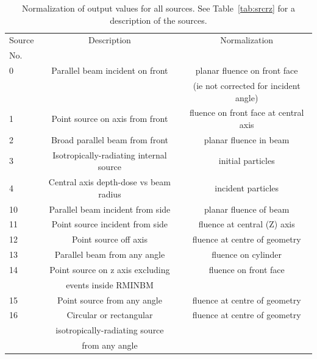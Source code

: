 \documentclass[12pt,twoside]{article}  %
\begin{document}
\begin{htmlonly}
\begin{table}[htb]
\begin{tabular}{|lcc|}
\caption[Normalization for all available sources.]
{Normalization of output values for all sources.  See Table~\ref{tab:srcrz}
for a description of the sources.}\\
\hline\hline
Source & Description & Normalization\\
No.  & & \\
\hline
0 & Parallel beam incident on front & planar fluence on front face \\
  &                                   & (ie not corrected for incident angle)\\
\hline
1 & Point source on axis from front & fluence on front face at central axis\\
\hline
2 & Broad parallel beam from front & planar fluence in beam\\
\hline
3 & Isotropically-radiating internal source & initial particles\\
\hline
4 & Central axis depth-dose vs beam radius & incident particles\\
\hline
10 & Parallel beam incident from side & planar fluence of beam\\
\hline
11 & Point source incident from side & fluence at  central (Z) axis\\
\hline
12 & Point source off axis & fluence at centre of geometry\\ 
\hline
13 & Parallel beam from any angle & fluence on cylinder\\
\hline
14 & Point source on z axis excluding & fluence on front face\\
   & events inside RMINBM                 & \\
\hline
15 & Point source from any angle & fluence at centre of geometry\\
\hline
16 & Circular or rectangular & fluence at centre of geometry\\ 
   & isotropically-radiating source & \\
   & from any angle  &\\

\end{tabular}
\end{table}
\end{htmlonly}
\end{document}
